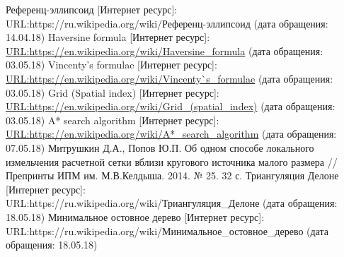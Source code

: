 \begin{thebibliography}{8}
	 Референц-эллипсоид [Интернет ресурс]:\\
	URL:https://ru.wikipedia.org/wiki/Референц-эллипсоид (дата обращения: 14.04.18)
	 Haversine formula [Интернет ресурс]:
	\url{URL:https://en.wikipedia.org/wiki/Haversine_formula} (дата обращения: 03.05.18)
	 Vincenty's formulae [Интернет ресурс]:
	\url{URL:https://en.wikipedia.org/wiki/Vincenty`s_formulae} (дата обращения: 03.05.18)
	 Grid (Spatial index) [Интернет ресурс]:
	\url{URL:https://en.wikipedia.org/wiki/Grid_(spatial_index)} (дата обращения: 03.05.18)
	 A* search algorithm [Интернет ресурс]:
	\url{URL:https://en.wikipedia.org/wiki/A*_search_algorithm} (дата обращения: 07.05.18)
	  Митрушкин Д.А., Попов Ю.П. Об
	одном способе локального измельчения расчетной сетки вблизи кругового источника малого
	размера // Препринты ИПМ им. М.В.Келдыша. 2014. № 25. 32 с.
	 Триангуляция Делоне [Интернет ресурс]:\\
	URL:https://ru.wikipedia.org/wiki/Триангуляция\_Делоне (дата обращения: 18.05.18)
	 Минимальное остовное дерево [Интернет ресурс]:\\
	URL:https://ru.wikipedia.org/wiki/Минимальное\_остовное\_дерево (дата обращения: 18.05.18)
\end{thebibliography}
